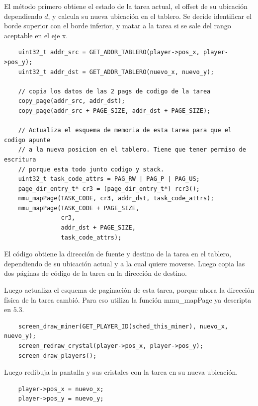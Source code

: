 \documentclass[a4paper]{article}
\newenvironment{codesnippet}{%
	\begin{Sbox}\begin{minipage}{\textwidth}\sffamily\small}%
	{\end{minipage}\end{Sbox}%
		\begin{center}%
		\vspace{-0.4cm}\colorbox{litegrey}{\TheSbox}\end{center}\vspace{0.3cm}}
\begin{document}
El método primero obtiene el estado de la tarea actual, el offset de su ubicación dependiendo $d$, y calcula su nueva
ubicación en el tablero. Se decide identificar el borde superior con el borde inferior, y matar a la tarea si se sale
del rango aceptable en el eje x.

\begin{codesnippet}
  \begin{verbatim}
    uint32_t addr_src = GET_ADDR_TABLERO(player->pos_x, player->pos_y);
    uint32_t addr_dst = GET_ADDR_TABLERO(nuevo_x, nuevo_y);

    // copia los datos de las 2 pags de codigo de la tarea
    copy_page(addr_src, addr_dst);
    copy_page(addr_src + PAGE_SIZE, addr_dst + PAGE_SIZE);

    // Actualiza el esquema de memoria de esta tarea para que el codigo apunte
    // a la nueva posicion en el tablero. Tiene que tener permiso de escritura
    // porque esta todo junto codigo y stack.
    uint32_t task_code_attrs = PAG_RW | PAG_P | PAG_US;
    page_dir_entry_t* cr3 = (page_dir_entry_t*) rcr3();
    mmu_mapPage(TASK_CODE, cr3, addr_dst, task_code_attrs);
    mmu_mapPage(TASK_CODE + PAGE_SIZE,
                cr3,
                addr_dst + PAGE_SIZE,
                task_code_attrs);
     \end{verbatim}
\end{codesnippet} 

El código obtiene la dirección de fuente y destino de la tarea en el tablero, dependiendo de su ubicación actual y a la
cual quiere moverse. Luego copia las dos páginas de código de la tarea en la dirección de destino.

Luego actualiza el esquema de paginación de esta tarea, porque ahora la dirección física de la tarea cambió. Para eso
utiliza la función mmu_mapPage ya descripta en $5.3$.

\begin{codesnippet}
  \begin{verbatim}
    screen_draw_miner(GET_PLAYER_ID(sched_this_miner), nuevo_x, nuevo_y);
    screen_redraw_crystal(player->pos_x, player->pos_y);
    screen_draw_players();
     \end{verbatim}
\end{codesnippet}

Luego redibuja la pantalla y sus cristales con la tarea en su nueva ubicación.

\begin{codesnippet}
  \begin{verbatim}
    player->pos_x = nuevo_x;
    player->pos_y = nuevo_y;
     \end{verbatim}
\end{codesnippet}
\end{document}
